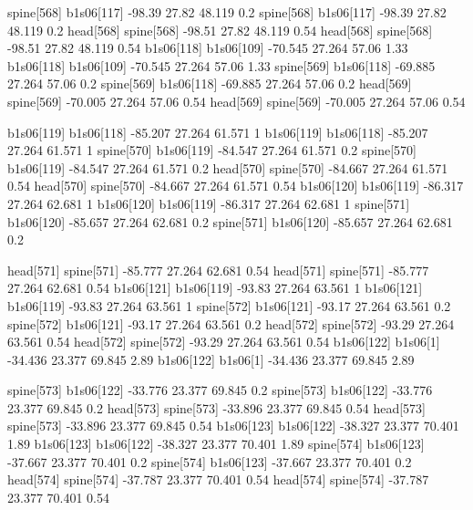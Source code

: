 spine[568]    b1s06[117]    -98.39    27.82    48.119    0.2
spine[568]    b1s06[117]    -98.39    27.82    48.119    0.2
head[568]    spine[568]    -98.51    27.82    48.119    0.54
head[568]    spine[568]    -98.51    27.82    48.119    0.54
b1s06[118]    b1s06[109]    -70.545    27.264    57.06    1.33
b1s06[118]    b1s06[109]    -70.545    27.264    57.06    1.33
spine[569]    b1s06[118]    -69.885    27.264    57.06    0.2
spine[569]    b1s06[118]    -69.885    27.264    57.06    0.2
head[569]    spine[569]    -70.005    27.264    57.06    0.54
head[569]    spine[569]    -70.005    27.264    57.06    0.54


b1s06[119]    b1s06[118]    -85.207    27.264    61.571    1
b1s06[119]    b1s06[118]    -85.207    27.264    61.571    1
spine[570]    b1s06[119]    -84.547    27.264    61.571    0.2
spine[570]    b1s06[119]    -84.547    27.264    61.571    0.2
head[570]    spine[570]    -84.667    27.264    61.571    0.54
head[570]    spine[570]    -84.667    27.264    61.571    0.54
b1s06[120]    b1s06[119]    -86.317    27.264    62.681    1
b1s06[120]    b1s06[119]    -86.317    27.264    62.681    1
spine[571]    b1s06[120]    -85.657    27.264    62.681    0.2
spine[571]    b1s06[120]    -85.657    27.264    62.681    0.2


head[571]    spine[571]    -85.777    27.264    62.681    0.54
head[571]    spine[571]    -85.777    27.264    62.681    0.54
b1s06[121]    b1s06[119]    -93.83    27.264    63.561    1
b1s06[121]    b1s06[119]    -93.83    27.264    63.561    1
spine[572]    b1s06[121]    -93.17    27.264    63.561    0.2
spine[572]    b1s06[121]    -93.17    27.264    63.561    0.2
head[572]    spine[572]    -93.29    27.264    63.561    0.54
head[572]    spine[572]    -93.29    27.264    63.561    0.54
b1s06[122]    b1s06[1]    -34.436    23.377    69.845    2.89
b1s06[122]    b1s06[1]    -34.436    23.377    69.845    2.89


spine[573]    b1s06[122]    -33.776    23.377    69.845    0.2
spine[573]    b1s06[122]    -33.776    23.377    69.845    0.2
head[573]    spine[573]    -33.896    23.377    69.845    0.54
head[573]    spine[573]    -33.896    23.377    69.845    0.54
b1s06[123]    b1s06[122]    -38.327    23.377    70.401    1.89
b1s06[123]    b1s06[122]    -38.327    23.377    70.401    1.89
spine[574]    b1s06[123]    -37.667    23.377    70.401    0.2
spine[574]    b1s06[123]    -37.667    23.377    70.401    0.2
head[574]    spine[574]    -37.787    23.377    70.401    0.54
head[574]    spine[574]    -37.787    23.377    70.401    0.54


